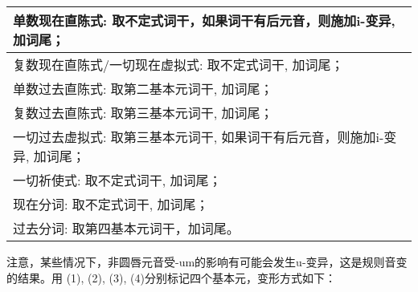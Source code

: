\begin{longtable}{l}
  \toprule
  单数现在直陈式: 取不定式词干，如果词干有后元音，则施加i-变异, 加词尾； \\
  \midrule
  \endhead
  \bottomrule
  \endfoot
  复数现在直陈式/一切现在虚拟式: 取不定式词干, 加词尾；          \\
  单数过去直陈式: 取第二基本元词干, 加词尾；                \\
  复数过去直陈式: 取第三基本元词干, 加词尾；                \\
  一切过去虚拟式: 取第三基本元词干, 如果词干有后元音，则施加i-变异,
  加词尾；                                   \\
  一切祈使式: 取不定式词干, 加词尾；                    \\
  现在分词: 取不定式词干, 加词尾；                     \\
  过去分词: 取第四基本元词干，加词尾。                    \\
\end{longtable}

注意，某些情况下，非圆唇元音受-um的影响有可能会发生u-变异，这是规则音变的结果。用
(1), (2), (3), (4)分别标记四个基本元，变形方式如下：

